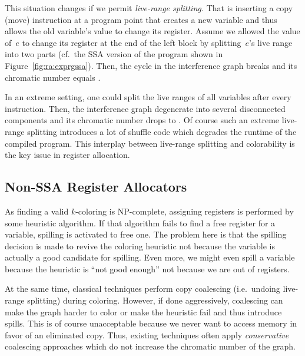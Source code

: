 {This situation changes if we permit \emph{live-range splitting.}
That is inserting a copy (move) instruction at a program point that creates a new variable and thus allows the old variable's value to change its register. 
Assume we allowed the value of~$e$ to change its register at the end of the left block by splitting~$e$'s live range into two parts (cf.~the SSA version of the program shown in Figure~\ref{fig:ra:exprgssa}).
Then, the cycle in the interference graph breaks and its chromatic number equals \maxlive.


In an extreme setting, one could split the live ranges of all variables after every instruction.
Then, the interference graph degenerate into several disconnected components and its chromatic number drops to \maxlive.
Of course such an extreme live-range splitting introduces a lot of shuffle code which degrades the runtime of the compiled program.
This interplay between live-range splitting and colorability is the key issue in register allocation.

\subsection{Non-SSA Register Allocators}
As finding a valid $k$-coloring is NP-complete, assigning registers is performed by some heuristic algorithm.
If that algorithm fails to find a free register for a variable, spilling is activated to free one.
The problem here is that the spilling decision is made to revive the coloring heuristic not because the variable is actually a good candidate for spilling. 
Even more, we might even spill a variable because the heuristic is ``not good enough'' not because we are out of registers.

At the same time, classical techniques perform copy coalescing (i.e.~undoing live-range splitting) during coloring.
However, if done aggressively, coalescing can make the graph harder to color or make the heuristic fail and thus introduce spills.
This is of course unacceptable because we never want to access memory in favor of an eliminated copy.
Thus, existing techniques often apply \emph{conservative} coalescing approaches which do not increase the chromatic number of the graph.

}
